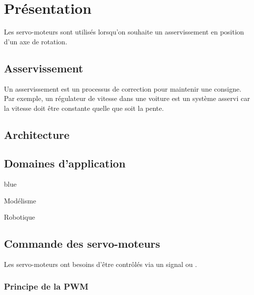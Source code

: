 \chapter{Présentation}

\newcommand{\servo}{servo-moteurs } 


Les \servo sont utilisés lorsqu'on souhaite un asservissement en position d'un axe de rotation.



\section{Asservissement}

Un asservissement est un processus de correction pour maintenir une consigne. \\
Par exemple, un régulateur de vitesse dans une voiture est un système asservi car la vitesse 
doit être constante quelle que soit la pente.


\section{Architecture}


\section{Domaines d'application}

\begin{items}{blue}{\Bullet}
    \item Modélisme
    \item Robotique
\end{items}

\section{Commande des \servo}

Les \servo ont besoins d'être contrôlés via un signal  ou . %

\subsection{Principe de la PWM}

